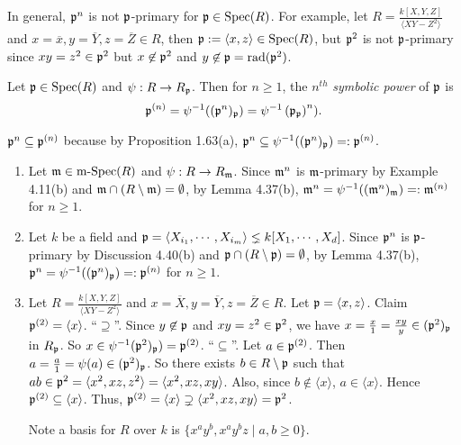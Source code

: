 \begin{example}
    In general, $\mathfrak{p}^{n}$ is not $\mathfrak{p}$-primary for $\mathfrak{p} \in \operatorname{Spec}(R)$. For example, let $R = \frac{k[X,Y,Z]}{\langle XY-Z^{2} \rangle}$ and $x = \overline x,y = \overline Y, z = \overline Z \in R$, then $\mathfrak{p} := \langle x,z \rangle \in \operatorname{Spec}(R)$, but $\mathfrak{p}^{2}$ is not $\mathfrak{p}$-primary since $xy = z^{2} \in \mathfrak{p}^{2}$ but $x \not \in \mathfrak{p}^{2}$ and $y \not \in \mathfrak{p} = \operatorname{rad}(\mathfrak{p}^{2})$.
\end{example}

\begin{definition}
    Let $\mathfrak{p} \in \operatorname{Spec}(R)$ and $\psi: R \to R_{\mathfrak{p}}$. Then for $n \geq 1$, the $n^{th}$ \emph{symbolic power} of $\mathfrak{p}$ is \[\mathfrak{p}^{(n)} = \psi^{-1}((\mathfrak{p}^{n})_{\mathfrak{p}}) = \psi^{-1}\left( \mathfrak{p}_{\mathfrak{p}} \right)^{n}).\] 
\end{definition}

\begin{note}
    $\mathfrak{p}^{n} \subseteq \mathfrak{p}^{(n)}$ because by Proposition 1.63(a), $\mathfrak{p}^{n} \subseteq \psi^{-1}((\mathfrak{p}^{n})_{\mathfrak{p}}) =: \mathfrak{p}^{(n)}$.
\end{note}

\begin{example}
    \begin{enumerate}
        \item 
            Let $\mathfrak{m} \in \operatorname{m-Spec}(R)$ and $\psi: R \to R_{\mathfrak{m}}$. Since $\mathfrak{m}^{n}$ is $\mathfrak{m}$-primary by Example 4.11(b) and $\mathfrak{m} \cap (R \setminus \mathfrak{m}) = \emptyset$, by Lemma 4.37(b), $\mathfrak{m}^{n} = \psi^{-1}((\mathfrak{m}^{n})_{\mathfrak{m}}) =: \mathfrak{m}^{(n)}$ for $n \geq 1$. 
        \item Let $k$ be a field and $\mathfrak{p} = \langle X_{i_1}, \cdots, X_{i_m} \rangle \lneq k[X_1,\cdots,X_d]$. Since $\mathfrak{p}^{n}$ is $\mathfrak{p}$-primary by Discussion 4.40(b) and $\mathfrak{p} \cap (R \setminus \mathfrak{p}) = \emptyset$, by Lemma 4.37(b), $\mathfrak{p}^{n} = \psi^{-1}((\mathfrak{p}^{n})_{\mathfrak{p}}) =: \mathfrak{p}^{(n)}$ for $n \geq 1$.
        \item Let $R = \frac{k[X,Y,Z]}{\langle XY-Z^{2} \rangle}$ and $x = \overbar X, y = \overline Y, z = \overbar Z \in R$. Let $\mathfrak{p} = \langle x, z \rangle$. Claim $\mathfrak{p}^{(2)} = \langle x \rangle$. ``$\supseteq$''. Since $y \not \in \mathfrak{p}$ and $xy = z^{2} \in \mathfrak{p}^{2}$, we have $x = \frac{x}{1} = \frac{xy}{y} \in (\mathfrak{p}^{2})_{\mathfrak{p}}$ in $R_{\mathfrak{p}}$. So $x \in \psi^{-1}(\mathfrak{p}^{2})_{\mathfrak{p}}) = \mathfrak{p}^{(2)}$. ``$\subseteq$''. Let $a \in \mathfrak{p}^{(2)}$. Then $a = \frac{a}{1} = \psi(a) \in (\mathfrak{p}^{2})_{\mathfrak{p}}$. So there exists $b \in R \setminus \mathfrak{p}$ such that $ab \in \mathfrak{p}^{2} = \langle x^{2},xz,z^{2} \rangle = \langle x^{2}, xz,xy \rangle$. Also, since $b \not \in \langle x \rangle$, $a \in \langle x \rangle$. Hence $\mathfrak{p}^{(2)} \subseteq \langle x \rangle$. Thus, $\mathfrak{p}^{(2)} = \langle x \rangle \supsetneq \langle x^{2},xz,xy \rangle = \mathfrak{p}^{2}$. \par Note a basis for $R$ over $k$ is $\{x^{a}y^{b},x^{a}y^{b}z \mid a,b \geq 0\}$. 
    \end{enumerate}
\end{example}

